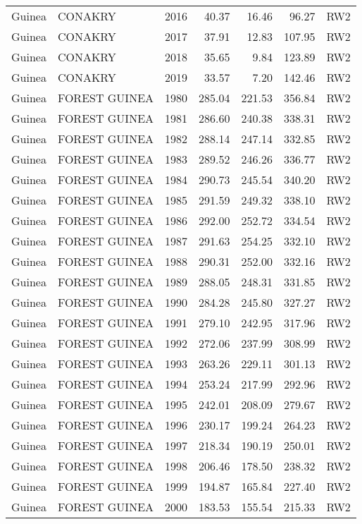 \begin{longtable}{lllrrrl}
  Guinea & CONAKRY & 2016 & 40.37 & 16.46 & 96.27 & RW2 \\ 
  Guinea & CONAKRY & 2017 & 37.91 & 12.83 & 107.95 & RW2 \\ 
  Guinea & CONAKRY & 2018 & 35.65 & 9.84 & 123.89 & RW2 \\ 
  Guinea & CONAKRY & 2019 & 33.57 & 7.20 & 142.46 & RW2 \\ 
  Guinea & FOREST GUINEA & 1980 & 285.04 & 221.53 & 356.84 & RW2 \\ 
  Guinea & FOREST GUINEA & 1981 & 286.60 & 240.38 & 338.31 & RW2 \\ 
  Guinea & FOREST GUINEA & 1982 & 288.14 & 247.14 & 332.85 & RW2 \\ 
  Guinea & FOREST GUINEA & 1983 & 289.52 & 246.26 & 336.77 & RW2 \\ 
  Guinea & FOREST GUINEA & 1984 & 290.73 & 245.54 & 340.20 & RW2 \\ 
  Guinea & FOREST GUINEA & 1985 & 291.59 & 249.32 & 338.10 & RW2 \\ 
  Guinea & FOREST GUINEA & 1986 & 292.00 & 252.72 & 334.54 & RW2 \\ 
  Guinea & FOREST GUINEA & 1987 & 291.63 & 254.25 & 332.10 & RW2 \\ 
  Guinea & FOREST GUINEA & 1988 & 290.31 & 252.00 & 332.16 & RW2 \\ 
  Guinea & FOREST GUINEA & 1989 & 288.05 & 248.31 & 331.85 & RW2 \\ 
  Guinea & FOREST GUINEA & 1990 & 284.28 & 245.80 & 327.27 & RW2 \\ 
  Guinea & FOREST GUINEA & 1991 & 279.10 & 242.95 & 317.96 & RW2 \\ 
  Guinea & FOREST GUINEA & 1992 & 272.06 & 237.99 & 308.99 & RW2 \\ 
  Guinea & FOREST GUINEA & 1993 & 263.26 & 229.11 & 301.13 & RW2 \\ 
  Guinea & FOREST GUINEA & 1994 & 253.24 & 217.99 & 292.96 & RW2 \\ 
  Guinea & FOREST GUINEA & 1995 & 242.01 & 208.09 & 279.67 & RW2 \\ 
  Guinea & FOREST GUINEA & 1996 & 230.17 & 199.24 & 264.23 & RW2 \\ 
  Guinea & FOREST GUINEA & 1997 & 218.34 & 190.19 & 250.01 & RW2 \\ 
  Guinea & FOREST GUINEA & 1998 & 206.46 & 178.50 & 238.32 & RW2 \\ 
  Guinea & FOREST GUINEA & 1999 & 194.87 & 165.84 & 227.40 & RW2 \\ 
  Guinea & FOREST GUINEA & 2000 & 183.53 & 155.54 & 215.33 & RW2 \\ 

\end{longtable}
